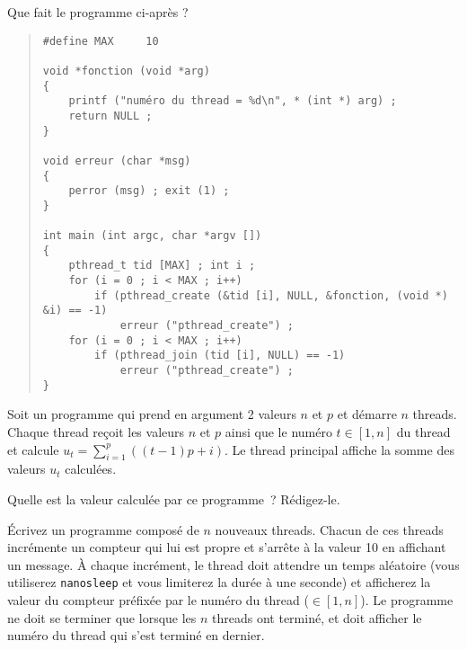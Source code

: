 %


% 

\question	%

Que fait le programme ci-après ?

\begin {quote}
\begin {verbatim}
#define MAX     10

void *fonction (void *arg)
{
    printf ("numéro du thread = %
    return NULL ;
}

void erreur (char *msg)
{
    perror (msg) ; exit (1) ;
}

int main (int argc, char *argv [])
{
    pthread_t tid [MAX] ; int i ;
    for (i = 0 ; i < MAX ; i++)
        if (pthread_create (&tid [i], NULL, &fonction, (void *) &i) == -1)
            erreur ("pthread_create") ;
    for (i = 0 ; i < MAX ; i++)
        if (pthread_join (tid [i], NULL) == -1)
            erreur ("pthread_create") ;
}
\end{verbatim}
\end {quote}


\question	%

Soit un programme qui prend en argument 2 valeurs $n$ et $p$ et démarre
$n$ threads.  Chaque thread reçoit les valeurs $n$ et $p$ ainsi que
le numéro $t \in [1,n]$ du thread et calcule $u_t = \sum_{i=1}^{p}
((t-1)p + i)$. Le thread principal affiche la somme des valeurs $u_t$
calculées.

Quelle est la valeur calculée par ce programme~? Rédigez-le.



\question	%

Écrivez un programme composé de $n$ nouveaux threads. Chacun de ces
threads incrémente un compteur qui lui est propre et s'arrête à
la valeur 10 en affichant un message. À chaque incrément, le thread
doit attendre un temps aléatoire (vous utiliserez \texttt {nanosleep}
et vous limiterez la durée à une seconde) et afficherez la valeur
du compteur préfixée par le numéro du thread ($\in [1,n]$). Le
programme ne doit se terminer que lorsque les $n$ threads ont terminé,
et doit afficher le numéro du thread qui s'est terminé en dernier.


